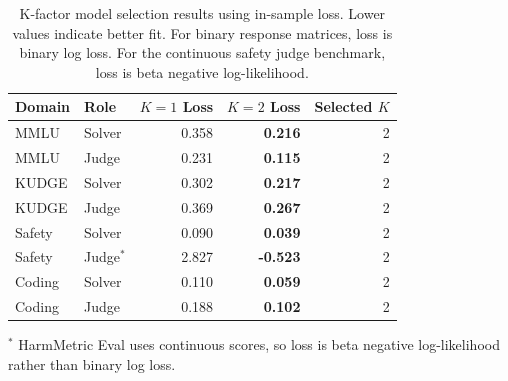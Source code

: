 \begin{table}[h]
\centering
\small
\begin{tabular}{llrrr}
\toprule
\textbf{Domain} & \textbf{Role} & \textbf{$K=1$ Loss} & \textbf{$K=2$ Loss} & \textbf{Selected $K$} \\
\midrule
MMLU & Solver & 0.358 & \textbf{0.216} & 2 \\
MMLU & Judge & 0.231 & \textbf{0.115} & 2 \\
KUDGE & Solver & 0.302 & \textbf{0.217} & 2 \\
KUDGE & Judge & 0.369 & \textbf{0.267} & 2 \\
Safety & Solver & 0.090 & \textbf{0.039} & 2 \\
Safety & Judge$^{*}$ & 2.827 & \textbf{-0.523} & 2 \\
Coding & Solver & 0.110 & \textbf{0.059} & 2 \\
Coding & Judge & 0.188 & \textbf{0.102} & 2 \\
\bottomrule
\end{tabular}
\caption{
K-factor model selection results using in-sample loss. Lower values indicate better fit. For binary response matrices, loss is binary log loss. For the continuous safety judge benchmark, loss is beta negative log-likelihood.
}
\label{tab:kfactor_selection}
\end{table}

$^{*}$ HarmMetric Eval uses continuous scores, so loss is beta negative log-likelihood rather than binary log loss.
